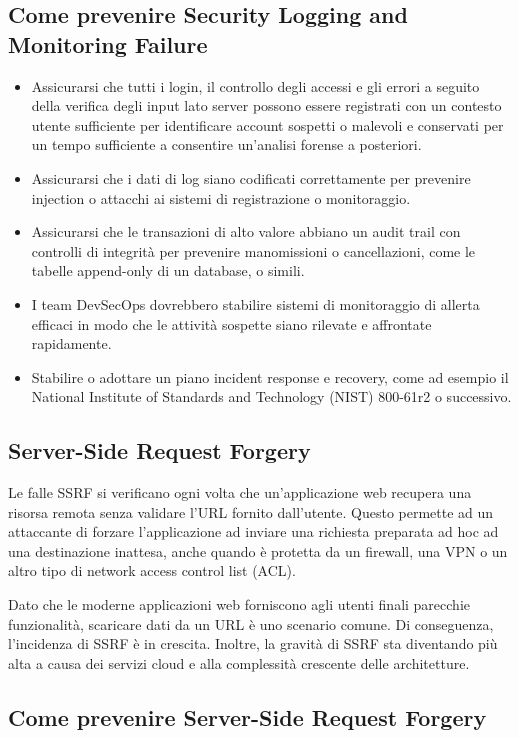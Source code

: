 \subsection{Come prevenire Security Logging and Monitoring Failure}
\begin{itemize}
    \item Assicurarsi che tutti i login, il controllo degli accessi e gli errori a seguito della verifica degli input lato server possono essere registrati con un contesto utente sufficiente per identificare account sospetti o malevoli e conservati per un tempo sufficiente a consentire un'analisi forense a posteriori.
    \item Assicurarsi che i dati di log siano codificati correttamente per prevenire injection o attacchi ai sistemi di registrazione o monitoraggio.
    \item Assicurarsi che le transazioni di alto valore abbiano un audit trail con controlli di integrità per prevenire manomissioni o cancellazioni, come le tabelle append-only di un database, o simili.
    \item I team DevSecOps dovrebbero stabilire sistemi di monitoraggio di allerta efficaci in modo che le attività sospette siano rilevate e affrontate rapidamente.
    \item Stabilire o adottare un piano incident response e recovery, come ad esempio il National Institute of Standards and Technology (NIST) 800-61r2 o successivo.
\end{itemize}
\subsection{Server-Side Request Forgery}
Le falle SSRF si verificano ogni volta che un'applicazione web recupera una risorsa remota senza validare l'URL fornito dall'utente. Questo permette ad un attaccante di forzare l'applicazione ad inviare una richiesta preparata ad hoc ad una destinazione inattesa, anche quando è protetta da un firewall, una VPN o un altro tipo di network access control list (ACL).

Dato che le moderne applicazioni web forniscono agli utenti finali parecchie funzionalità, scaricare dati da un URL è uno scenario comune. Di conseguenza, l'incidenza di SSRF è in crescita. Inoltre, la gravità di SSRF sta diventando più alta a causa dei servizi cloud e alla complessità crescente delle architetture.
\subsection{Come prevenire Server-Side Request Forgery}

